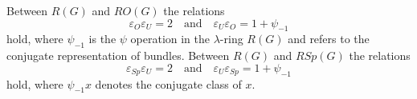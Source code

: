Between $R(G)$ and $RO(G)$ the relations
$$\varepsilon_O \varepsilon_U = 2 \quad \text{and} \quad \varepsilon_U \varepsilon_O = 1 + \psi_{-1}$$
hold, where $\psi_{-1}$ is the $\psi$ operation in the $\lambda$-ring $R(G)$ and refers to the conjugate representation of bundles.
Between $R(G)$ and $RSp(G)$ the relations
$$\varepsilon_{Sp} \varepsilon_U = 2 \quad \text{and} \quad \varepsilon_U \varepsilon_{Sp} = 1 + \psi_{-1}$$
hold, where $\psi_{-1}x$ denotes the conjugate class of $x$.
